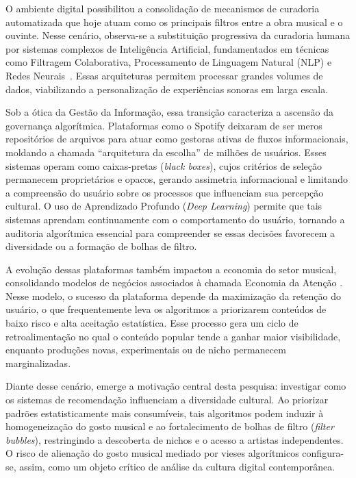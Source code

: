 \documentclass[12pt, %
openright,
oneside, %
a4paper,    %
english,   %
brazil]{facom-ufu-abntex2}
\begin{document}
O ambiente digital possibilitou a consolidação de mecanismos de curadoria
automatizada que hoje atuam como os principais filtros entre a obra musical e o
ouvinte. Nesse cenário, observa-se a substituição progressiva da curadoria
humana por sistemas complexos de Inteligência Artificial, fundamentados em
técnicas como Filtragem Colaborativa, Processamento de Linguagem Natural (NLP) e
Redes Neurais~\cite{ricci2022recommender}. Essas arquiteturas permitem processar grandes volumes de dados,
viabilizando a personalização de experiências sonoras em larga escala.

Sob a ótica da Gestão da Informação, essa transição caracteriza a ascensão da
governança algorítmica. Plataformas como o Spotify deixaram de ser meros
repositórios de arquivos para atuar como gestoras ativas de fluxos
informacionais, moldando a chamada ``arquitetura da escolha''
\cite{thaler2008nudge} de milhões de
usuários. Esses sistemas operam como caixas-pretas (\emph{black boxes}), cujos
critérios de seleção permanecem proprietários e opacos, gerando assimetria
informacional e limitando a compreensão do usuário sobre os processos que
influenciam sua percepção cultural. O uso de Aprendizado Profundo (\emph{Deep
Learning}) permite que tais sistemas aprendam continuamente com o comportamento
do usuário, tornando a auditoria algorítmica essencial para compreender se essas
decisões favorecem a diversidade ou a formação de bolhas de filtro.

A evolução dessas plataformas também impactou a economia do setor musical,
consolidando modelos de negócios associados à chamada Economia da Atenção
\cite{simon1971designing,davenport2001attention}. Nesse
modelo, o sucesso da plataforma depende da maximização da retenção do usuário, o
que frequentemente leva os algoritmos a priorizarem conteúdos de baixo risco e
alta aceitação estatística. Esse processo gera um ciclo de retroalimentação no
qual o conteúdo popular tende a ganhar maior visibilidade, enquanto produções
novas, experimentais ou de nicho permanecem marginalizadas.

Diante desse cenário, emerge a motivação central desta pesquisa: investigar como
os sistemas de recomendação influenciam a diversidade cultural. Ao priorizar
padrões estatisticamente mais consumíveis, tais algoritmos podem induzir à
homogeneização do gosto musical e ao fortalecimento de bolhas de filtro
(\emph{filter bubbles}), restringindo a descoberta de nichos e o acesso a
artistas independentes. O risco de alienação do gosto musical mediado por vieses
algorítmicos configura-se, assim, como um objeto crítico de análise da cultura
digital contemporânea.
\end{document}
